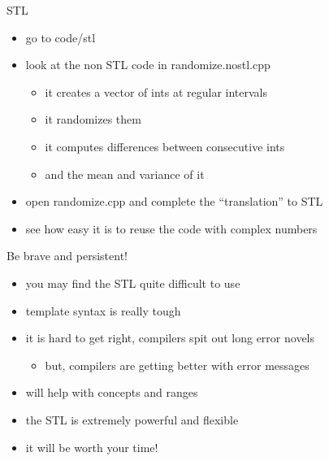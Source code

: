 \begin{frame}[fragile]
  \begin{exercise}{STL}
    \begin{itemize}
    \item go to code/stl
    \item look at the non STL code in randomize.nostl.cpp
      \begin{itemize}
        \item it creates a vector of ints at regular intervals
        \item it randomizes them
        \item it computes differences between consecutive ints
        \item and the mean and variance of it
      \end{itemize}
    \item open randomize.cpp and complete the ``translation'' to STL
    \item see how easy it is to reuse the code with complex numbers
    \end{itemize}
  \end{exercise}
\end{frame}

\begin{frame}[fragile]
  \begin{exampleblock}{Be brave and persistent!}
    \begin{itemize}
    \item you may find the STL quite difficult to use
    \item template syntax is really tough
    \item it is hard to get right, compilers spit out long error novels
    \begin{itemize}
      \item but, compilers are getting better with error messages
    \end{itemize}
    \item {} will help with concepts and ranges
    \item the STL is extremely powerful and flexible
    \item it will be worth your time!
    \end{itemize}
  \end{exampleblock}
\end{frame}
